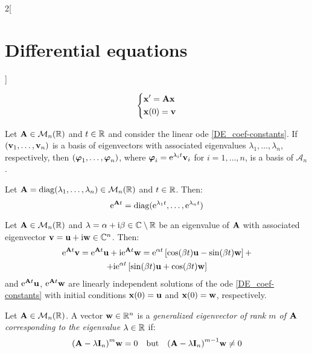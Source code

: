 \documentclass[../../../main.tex]{subfiles}
\begin{document}
\begin{multicols}{2}[\section{Differential equations}]
\begin{prop}
    $$
      \left\{
      \begin{aligned}
         & \boldsymbol{\mathrm{x}}'      =\boldsymbol{\mathrm{A}}\boldsymbol{\mathrm{x}} \\
         & \boldsymbol{\mathrm{x}}(0)  =\boldsymbol{\mathrm{v}}
      \end{aligned}
      \right.
    $$
  \end{prop}
  \begin{corollary}
    Let $\boldsymbol{\mathrm{A}}\in\mathcal{M}_n(\mathbb{R})$ and $t\in\mathbb{R}$ and consider the linear ode \eqref{DE_coef-constants}. If $(\boldsymbol{\mathrm{v}}_1,\ldots,\boldsymbol{\mathrm{v}}_n)$ is a basis of eigenvectors with associated eigenvalues $\lambda_1,\ldots,\lambda_n$, respectively, then $(\boldsymbol{\mathrm{\varphi}}_1,\ldots,\boldsymbol{\mathrm{\varphi}}_n)$, where $\boldsymbol{\mathrm{\varphi}}_i=\mathrm{e}^{\lambda_it}\boldsymbol{\mathrm{v}}_i$ for $i=1,\ldots,n$, is a basis of $\mathcal{A}_n$.
  \end{corollary}
  \begin{lemma}
    Let $\boldsymbol{\mathrm{A}}=\operatorname{diag}(\lambda_1,\ldots,\lambda_n)\in\mathcal{M}_n(\mathbb{R})$ and $t\in\mathbb{R}$. Then:
    $$\mathrm{e}^{\boldsymbol{\mathrm{A}}t}=\operatorname{diag}(\mathrm{e}^{\lambda_1 t},\ldots,\mathrm{e}^{\lambda_n t})$$
  \end{lemma}
  \begin{prop}
    Let $\boldsymbol{\mathrm{A}}\in\mathcal{M}_n(\mathbb{R})$ and $\lambda=\alpha+\mathrm{i}\beta\in\mathbb{C}\setminus\mathbb{R}$ be an eigenvalue of $\boldsymbol{\mathrm{A}}$ with associated eigenvector $\boldsymbol{\mathrm{v}}=\boldsymbol{\mathrm{u}}+\mathrm{i}\boldsymbol{\mathrm{w}}\in\mathbb{C}^n$. Then:
    \begin{multline*}
      \mathrm{e}^{\boldsymbol{\mathrm{A}}t}\boldsymbol{\mathrm{v}}=\mathrm{e}^{\boldsymbol{\mathrm{A}}t}\boldsymbol{\mathrm{u}}+\mathrm{i}\mathrm{e}^{\boldsymbol{\mathrm{A}}t}\boldsymbol{\mathrm{w}}=\mathrm{e}^{\alpha t}\left[\cos(\beta t)\boldsymbol{\mathrm{u}}-\sin(\beta t)\boldsymbol{\mathrm{w}}\right]+\\+\mathrm{i}\mathrm{e}^{\alpha t}\left[\sin(\beta t)\boldsymbol{\mathrm{u}}+\cos(\beta t)\boldsymbol{\mathrm{w}}\right]
    \end{multline*}
    and $\mathrm{e}^{\boldsymbol{\mathrm{A}}t}\boldsymbol{\mathrm{u}}$, $\mathrm{e}^{\boldsymbol{\mathrm{A}}t}\boldsymbol{\mathrm{w}}$ are linearly independent solutions of the ode \eqref{DE_coef-constants} with initial conditions $\boldsymbol{\mathrm{x}}(0)=\boldsymbol{\mathrm{u}}$ and $\boldsymbol{\mathrm{x}}(0)=\boldsymbol{\mathrm{w}}$, respectively.
  \end{prop}
  \begin{definition}
    Let $\boldsymbol{\mathrm{A}}\in\mathcal{M}_n(\mathbb{R})$. A vector $\boldsymbol{\mathrm{w}}\in\mathbb{R}^n$ is a \textit{generalized eigenvector of rank $m$ of $\boldsymbol{\mathrm{A}}$ corresponding to the eigenvalue $\lambda\in\mathbb{R}$} if: $${(\boldsymbol{\mathrm{A}}-\lambda\boldsymbol{\mathrm{I}}_n)}^m\boldsymbol{\mathrm{w}}=0\quad\text{but}\quad{(\boldsymbol{\mathrm{A}}-\lambda\boldsymbol{\mathrm{I}}_n)}^{m-1}\boldsymbol{\mathrm{w}}\ne 0$$

\end{definition}
\end{multicols}
\end{document}
